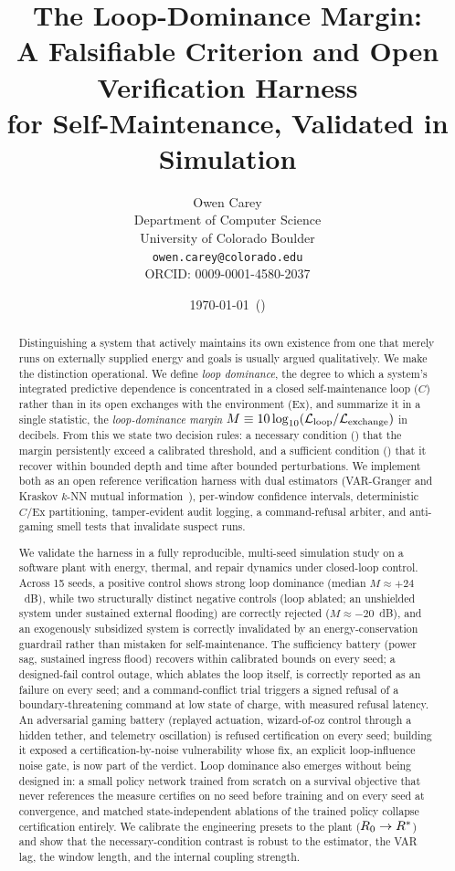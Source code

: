 \documentclass[11pt]{article}
\title{The Loop-Dominance Margin:\\ A Falsifiable Criterion and Open Verification Harness\\ for Self-Maintenance, Validated in Simulation}
\author{Owen Carey\\
Department of Computer Science\\
University of Colorado Boulder\\
\texttt{owen.carey@colorado.edu}\\
ORCID: 0009-0001-4580-2037}
\date{\today\ (\gitversion)}
\begin{document}
\maketitle

\begin{abstract}
Distinguishing a system that actively maintains its own existence from one that merely runs on externally supplied energy and goals is usually argued qualitatively. We make the distinction operational. We define \emph{loop dominance}, the degree to which a system's integrated predictive dependence is concentrated in a closed self-maintenance loop ($C$) rather than in its open exchanges with the environment ($\text{Ex}$), and summarize it in a single statistic, the \emph{loop-dominance margin} $M \equiv 10\log_{10}(\mathcal{L}_{\text{loop}}/\mathcal{L}_{\text{exchange}})$ in decibels. From this we state two decision rules: a necessary condition (\NC) that the margin persistently exceed a calibrated threshold, and a sufficient condition (\SC) that it recover within bounded depth and time after bounded perturbations. We implement both as an open reference verification harness with dual estimators (VAR-Granger and Kraskov $k$-NN mutual information~\cite{granger1969investigating,kraskov2004estimating}), per-window confidence intervals, deterministic $C/\text{Ex}$ partitioning, tamper-evident audit logging, a command-refusal arbiter, and anti-gaming smell tests that invalidate suspect runs.

We validate the harness in a fully reproducible, multi-seed simulation study on a software plant with energy, thermal, and repair dynamics under closed-loop control. Across 15 seeds, a positive control shows strong loop dominance (median $M \approx +24$~dB), while two structurally distinct negative controls (loop ablated; an unshielded system under sustained external flooding) are correctly rejected ($M \approx -20$~dB), and an exogenously subsidized system is correctly invalidated by an energy-conservation guardrail rather than mistaken for self-maintenance. The sufficiency battery (power sag, sustained ingress flood) recovers within calibrated bounds on every seed; a designed-fail control outage, which ablates the loop itself, is correctly reported as an \SC failure on every seed; and a command-conflict trial triggers a signed refusal of a boundary-threatening command at low state of charge, with measured refusal latency. An adversarial gaming battery (replayed actuation, wizard-of-oz control through a hidden tether, and telemetry oscillation) is refused certification on every seed; building it exposed a certification-by-noise vulnerability whose fix, an explicit loop-influence noise gate, is now part of the verdict. Loop dominance also emerges without being designed in: a small policy network trained from scratch on a survival objective that never references the measure certifies on no seed before training and on every seed at convergence, and matched state-independent ablations of the trained policy collapse certification entirely. We calibrate the engineering presets to the plant ($R_0 \rightarrow R^*$) and show that the necessary-condition contrast is robust to the estimator, the VAR lag, the window length, and the internal coupling strength.


\end{abstract}
\end{document}
